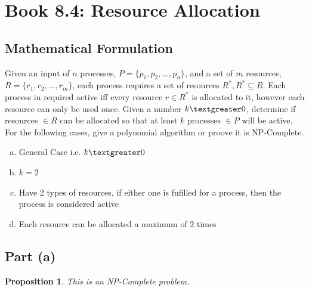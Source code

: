 \documentclass[12pt]{article}
\newtheorem{proposition}[theorem]{Proposition}
\begin{document}
\newpage

\section{Book 8.4: Resource Allocation}

\subsection*{Mathematical Formulation}
Given an input of $n$ processes, $P = \{p_1, p_2, ..., p_n\}$,  and a set of $m$
resources, $R = \{r_1, r_2, ..., r_m\}$, each process requires a set of resources
$R^{\ast}, R^{\ast} \subseteq R$. Each process in required active iff every resource
$r \in R^{\ast}$ is allocated to it, however each resource can only be used once.
Given a number $k \textgreater 0$, determine if resources $\in R$ can be allocated
so that at least $k$ processes $\in P$ will be active. For the following cases,
give a polynomial algorithm or proove it is NP-Complete.
\begin{enumerate}[(a)]
    \item General Case i.e. $k \textgreater 0$
    \item $k = 2$
    \item Have 2 types of resources, if either one is fufilled for a process, then
        the process is considered active
    \item Each resource can be allocated a maximum of 2 times
\end{enumerate}

\subsection{Part (a)}
\begin{proposition}
This is an NP-Complete problem.
\end{proposition}
\end{document}
